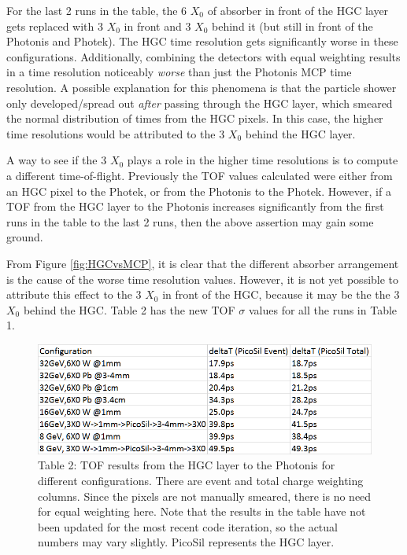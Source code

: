 \documentclass[12pt]{article}
\begin{document}
For the last 2 runs in the table, the 6 $X_0$ of absorber in front of the HGC layer gets replaced with 3 $X_0$ in front and 3 $X_0$ behind it (but still in front of the Photonis and Photek).
The HGC time resolution gets significantly worse in these configurations.
Additionally, combining the detectors with equal weighting results in a time resolution noticeably \textit{worse} than just the Photonis MCP time resolution.
A possible explanation for this phenomena is that the particle shower only developed/spread out \textit{after} passing through the HGC layer, which smeared the normal distribution of times from the HGC pixels. 
In this case, the higher time resolutions would be attributed to the 3 $X_0$ behind the HGC layer.

A way to see if the 3 $X_0$ plays a role in the higher time resolutions is to compute a different time-of-flight.
Previously the TOF values calculated were either from an HGC pixel to the Photek, or from the Photonis to the Photek.
However, if a TOF from the HGC layer to the Photonis increases significantly from the first runs in the table to the last 2 runs, then the above assertion may gain some ground.

From Figure \ref{fig:HGCvsMCP}, it is clear that the different absorber arrangement is the cause of the worse time resolution values.
However, it is not yet possible to attribute this effect to the 3 $X_0$ in front of the HGC, because it may be the the 3 $X_0$ behind the HGC.
Table 2 has the new TOF $\sigma$ values for all the runs in Table 1.

\begin{figure}[t]
\centering
	\includegraphics[width=0.75\linewidth]{table_HGC_vs_MCP.png}
	\caption*{Table 2:
	TOF results from the HGC layer to the Photonis for different configurations.
	There are event and total charge weighting columns.
	Since the pixels are not manually smeared, there is no need for equal weighting here.
	Note that the results in the table have not been updated for the most recent code iteration,
	so the actual numbers may vary slightly.
	PicoSil represents the HGC layer.}
\end{figure}
\end{document}
